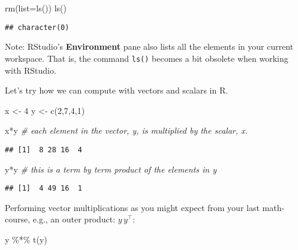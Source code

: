 \documentclass[
]{book}
\newenvironment{Shaded}{\begin{snugshade}}{\end{snugshade}}
\newcommand{\AttributeTok}[1]{\textcolor[rgb]{0.77,0.63,0.00}{#1}}
\newcommand{\CommentTok}[1]{\textcolor[rgb]{0.56,0.35,0.01}{\textit{#1}}}
\newcommand{\DecValTok}[1]{\textcolor[rgb]{0.00,0.00,0.81}{#1}}
\newcommand{\FunctionTok}[1]{\textcolor[rgb]{0.00,0.00,0.00}{#1}}
\newcommand{\NormalTok}[1]{#1}
\newcommand{\OtherTok}[1]{\textcolor[rgb]{0.56,0.35,0.01}{#1}}
\newcommand{\SpecialCharTok}[1]{\textcolor[rgb]{0.00,0.00,0.00}{#1}}
\begin{document}
\begin{Shaded}
\begin{Highlighting}[]
\FunctionTok{rm}\NormalTok{(}\AttributeTok{list=}\FunctionTok{ls}\NormalTok{())}
\FunctionTok{ls}\NormalTok{()}
\end{Highlighting}
\end{Shaded}

\begin{verbatim}
## character(0)
\end{verbatim}

Note: RStudio's \textbf{Environment} pane also lists all the elements in your current workspace. That is, the command \texttt{ls()} becomes a bit obsolete when working with RStudio.

Let's try how we can compute with vectors and scalars in R.

\begin{Shaded}
\begin{Highlighting}[]
\NormalTok{x }\OtherTok{\textless{}{-}} \DecValTok{4}
\NormalTok{y }\OtherTok{\textless{}{-}} \FunctionTok{c}\NormalTok{(}\DecValTok{2}\NormalTok{,}\DecValTok{7}\NormalTok{,}\DecValTok{4}\NormalTok{,}\DecValTok{1}\NormalTok{)}

\NormalTok{x}\SpecialCharTok{*}\NormalTok{y }\CommentTok{\# each element in the vector, y, is multiplied by the scalar, x.}
\end{Highlighting}
\end{Shaded}

\begin{verbatim}
## [1]  8 28 16  4
\end{verbatim}

\begin{Shaded}
\begin{Highlighting}[]
\NormalTok{y}\SpecialCharTok{*}\NormalTok{y }\CommentTok{\# this is a term by term product of the elements in y}
\end{Highlighting}
\end{Shaded}

\begin{verbatim}
## [1]  4 49 16  1
\end{verbatim}

Performing vector multiplications as you might expect from your last math-course, e.g., an outer product: \(y\,y^\top\):

\begin{Shaded}
\begin{Highlighting}[]
\NormalTok{y }\SpecialCharTok{\%*\%} \FunctionTok{t}\NormalTok{(y)}
\end{Highlighting}
\end{Shaded}
\end{document}
